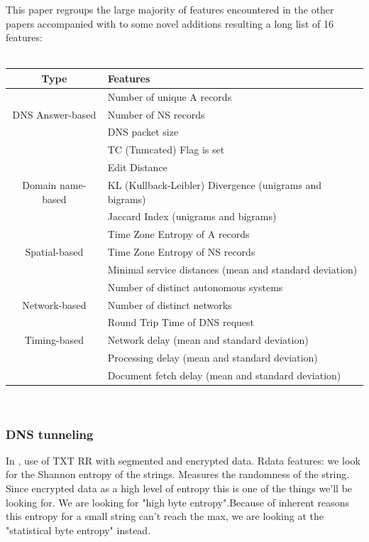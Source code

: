 This paper\cite{ff5} regroups the large majority of features encountered in the other papers accompanied with to some novel additions resulting a long list of 16 features: \\\\
\begin{tabular}{c|l}
Type & Features\\
\hline
 & Number of unique A records\\
DNS Answer-based &  Number of NS records\\
 & DNS packet size\\
 & TC (Tnmcated) Flag is set\\
\hline
 & Edit Distance\\
Domain name-based & KL (Kullback-Leibler) Divergence (unigrams and bigrams)\\
 & Jaccard Index (unigrams and bigrams)\\
\hline
 & Time Zone Entropy of A records\\
Spatial-based & Time Zone Entropy of NS records\\
 & Minimal service distances (mean and standard deviation)\\
\hline
 & Number of distinct autonomous systems\\
Network-based & Number of distinct networks\\
 \hline
 & Round Trip Time of DNS request\\
Timing-based & Network delay (mean and standard deviation)\\
& Processing delay (mean and standard deviation)\\
& Document fetch delay (mean and standard deviation)\\
\end{tabular}
\\


\subsubsection{DNS tunneling}
In \cite{tunn1}, use of TXT RR with segmented and encrypted data.
Rdata features: we look for the Shannon entropy of the strings. Measures the randomness of the string. Since encrypted data as a high level of entropy this is one of the things we'll be looking for. We are looking for "high byte entropy".Because of inherent reasons this entropy for a small string can't reach the max, we are looking at the "statistical byte entropy" instead.

